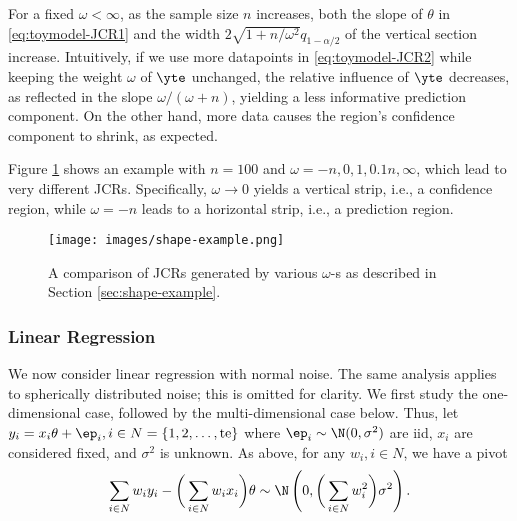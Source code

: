 \documentclass[english]{article}
\begin{document}
For a fixed $\omega < \infty$, as the sample size $n$ increases, both 
the slope of $\theta$ in \eqref{eq:toymodel-JCR1} 
and the width $2\sqrt{1 + n/\omega^2}q_{1-\alpha/2}$  of the vertical section increase. 
Intuitively, if we use more datapoints in \eqref{eq:toymodel-JCR2} while keeping the weight $\omega$ of $\yte$ unchanged, the relative influence of $\yte$ decreases,
as reflected in the slope $\omega/(\omega + n)$, yielding a less informative prediction component.
On the other hand, more data causes the region's confidence component to shrink, as expected.


Figure \ref{fig:shape-example1} shows an example with $n=100$ 
and $\omega = -n,0,1,0.1n,\infty$, 
which lead to very different JCRs. Specifically, $\omega \rightarrow 0$ yields a vertical strip, i.e., a confidence region, 
while $\omega = -n$ leads to a  horizontal strip, i.e., a prediction region. 

\begin{figure}[ht]
    \centering
    \texttt{[image: images/shape-example.png]}
\caption{A comparison of JCRs generated by various $\omega$-s as described in Section \ref{sec:shape-example}.}
\label{fig:shape-example1}

\end{figure}


\subsubsection{Linear Regression}

We now consider linear regression with normal noise. 
The same analysis applies to spherically distributed noise; this is omitted for clarity.
We first study the one-dimensional case, followed by the multi-dimensional case below.
Thus, let $y_i = x_i\theta + \ep_i, i \in N = \{1,2,\ldots,\mathrm{te}\}$ where $\ep_i \sim \N(0,\sigma^2)$ are iid, 
$x_i$ are considered fixed, and $\sigma^2$ is unknown.
As above, for any $w_i,i\in N$,
we have a pivot
\begin{align*}\label{eq:lr-pivot}
    \sum_{i \in N} w_i y_i - \bigg(\sum_{i \in N} w_i x_i\bigg)\theta \sim \N\left(0,\bigg(\sum_{i \in N} w_i^2\bigg)\sigma^2\right).
\end{align*}
\end{document}
